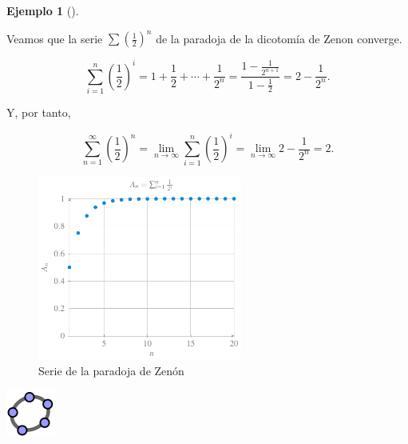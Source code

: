 \documentclass[
  a4paper,
]{scrreport}
\theoremstyle{definition}
\newtheorem{example}{Ejemplo}[chapter]
\theoremstyle{plain}
\theoremstyle{definition}
\theoremstyle{definition}
\theoremstyle{plain}
\theoremstyle{plain}
\theoremstyle{remark}
\begin{document}
\begin{example}[]\protect\hypertarget{exm-serie-paradoja-zenon}{}\label{exm-serie-paradoja-zenon}

Veamos que la serie \(\sum \left(\frac{1}{2}\right)^n\) de la paradoja
de la dicotomía de Zenon converge.

\[
\sum_{i=1}^n \left(\frac{1}{2}\right)^i = 1 + \frac{1}{2} + \cdots +\frac{1}{2^n} = \frac{1-\frac{1}{2^{n+1}}}{1-\frac{1}{2}} = 2-\frac{1}{2^n}.
\]

Y, por tanto,

\[
\sum_{n=1}^\infty \left(\frac{1}{2}\right)^n = \lim_{n\to\infty} \sum_{i=1}^n \left(\frac{1}{2}\right)^i = \lim_{n\to\infty} 2-\frac{1}{2^n} = 2.
\]

\begin{figure}[H]

{\centering \includegraphics[width=0.6\textwidth,height=\textheight]{img/series/serie-paradoja-zenon.pdf}

}

\caption{Serie de la paradoja de Zenón}

\end{figure}%

\includegraphics{img/logos/logo-geogebra.png}

\end{example}
\end{document}
